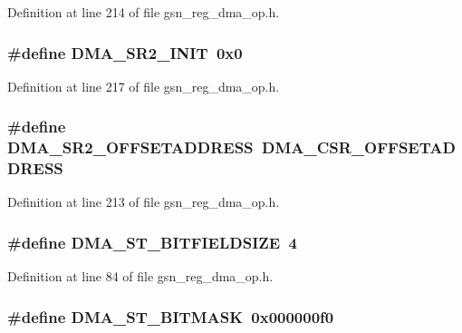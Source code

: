 Definition at line 214 of file gsn\_\-reg\_\-dma\_\-op.h.

\hypertarget{a00547_a813c497e81e26f04cb817525f4e76832}{
\subsubsection[{DMA\_\-SR2\_\-INIT}]{\setlength{\rightskip}{0pt plus 5cm}\#define DMA\_\-SR2\_\-INIT~0x0}}
\label{a00547_a813c497e81e26f04cb817525f4e76832}


Definition at line 217 of file gsn\_\-reg\_\-dma\_\-op.h.

\hypertarget{a00547_a572efc5b5c8c74bbb08f69c023b7a776}{
\subsubsection[{DMA\_\-SR2\_\-OFFSETADDRESS}]{\setlength{\rightskip}{0pt plus 5cm}\#define DMA\_\-SR2\_\-OFFSETADDRESS~DMA\_\-CSR\_\-OFFSETADDRESS}}
\label{a00547_a572efc5b5c8c74bbb08f69c023b7a776}


Definition at line 213 of file gsn\_\-reg\_\-dma\_\-op.h.

\hypertarget{a00547_a8f73d54fc0c18d5e34dc3d38b52e7530}{
\subsubsection[{DMA\_\-ST\_\-BITFIELDSIZE}]{\setlength{\rightskip}{0pt plus 5cm}\#define DMA\_\-ST\_\-BITFIELDSIZE~4}}
\label{a00547_a8f73d54fc0c18d5e34dc3d38b52e7530}


Definition at line 84 of file gsn\_\-reg\_\-dma\_\-op.h.

\hypertarget{a00547_a2807548dce19bf6af704d4105594f939}{
\subsubsection[{DMA\_\-ST\_\-BITMASK}]{\setlength{\rightskip}{0pt plus 5cm}\#define DMA\_\-ST\_\-BITMASK~0x000000f0}}
\label{a00547_a2807548dce19bf6af704d4105594f939}


